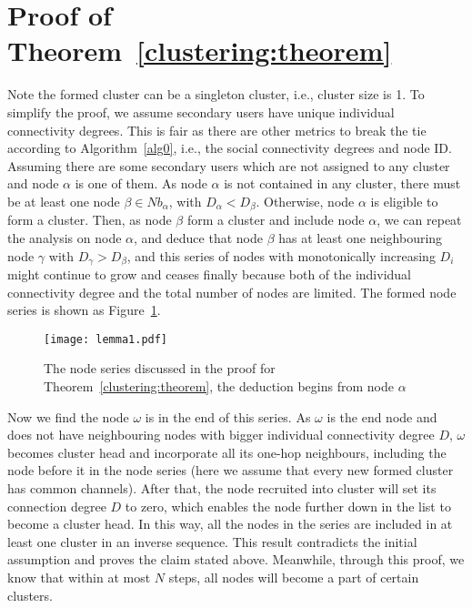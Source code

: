 \documentclass[journal,comsoc]{IEEEtran}
\makeatletter
\theoremstyle{mytheoremstyle}
\theoremstyle{mytheoremstyle}
\theoremstyle{mytheoremstyle}
\renewenvironment{proof}[1][\proofname]{%
      \par\pushQED{\qed}\fontfamily{ptm}\selectfont%
      \topsep6\p@\@plus6\p@\relax
      \trivlist\item[\hskip\labelsep\bfseries#1\@addpunct{.}]%
      \ignorespaces
    }{%
      \popQED\endtrivlist\@endpefalse
    }
\newcommand{\ie}{i.e., }
\makeatother
\begin{document}
\section*{Proof of Theorem~\ref{clustering:theorem}}
\label{proof_clustering:theorem}
\begin{proof}
Note the formed cluster can be a singleton cluster, \ie cluster size is 1.
To simplify the proof, we assume secondary users have unique individual connectivity degrees.
This is fair as there are other metrics to break the tie according to Algorithm~\ref{alg0}, \ie the social connectivity degrees and node ID.
Assuming there are some secondary users which are not assigned to any cluster and node $\alpha$ is one of them.
As node $\alpha$ is not contained in any cluster, there must be at least one node $\beta\in Nb_\alpha$, with $D_{\alpha} < D_{\beta}$.
Otherwise, node $\alpha$ is eligible to form a cluster.
Then, as node $\beta$ form a cluster and include node $\alpha$, we can repeat the analysis on node $\alpha$, and deduce that node $\beta$ has at least one neighbouring node $\gamma$ with $D_{\gamma}>D_{\beta}$, and this series of nodes with monotonically increasing $D_i$ might continue to grow and ceases finally because both of the individual connectivity degree 
and the total number of nodes are limited.
The formed node series is shown as Figure~\ref{lemma1}.

\begin{figure}[ht!]
  \centering
\texttt{[image: lemma1.pdf]}
	\caption{The node series discussed in the proof for Theorem~\ref{clustering:theorem}, the deduction begins from node $\alpha$}
	\label{lemma1}
\end{figure}


Now we find the node $\omega$ is in the end of this series.
As $\omega$ is the end node and does not have neighbouring nodes with bigger individual connectivity degree $D$, $\omega$ becomes cluster head and incorporate all its one-hop neighbours, including the node before it in the node series (here we assume that every new formed cluster has common channels).
After that, the node recruited into cluster will set its connection degree $D$ to zero, which enables the node further down in the list to become a cluster head.
In this way, all the nodes in the series are included in at least one cluster in an inverse sequence.
This result contradicts the initial assumption and proves the claim stated above.
Meanwhile, through this proof, we know that within at most $N$ steps, all nodes will become a part of certain clusters.
\end{proof}
\end{document}
